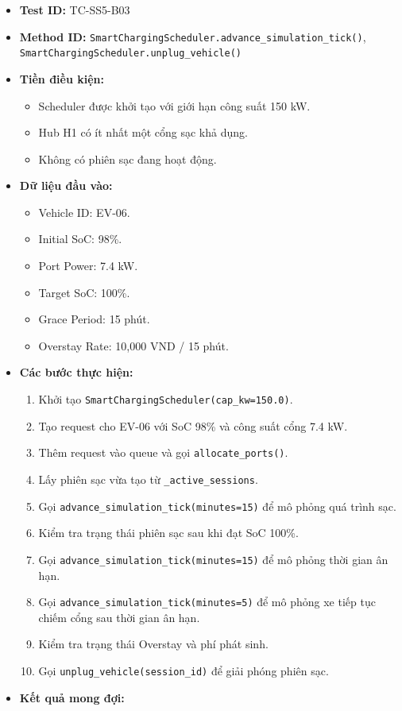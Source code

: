\documentclass[11pt,a4paper]{article}
\providecommand{\tightlist}{%
  \setlength{\itemsep}{0pt}\setlength{\parskip}{0pt}}
\begin{document}
\begin{itemize}
\tightlist
\item
  \textbf{Test ID:} TC-SS5-B03
\item
  \textbf{Method ID:}
  \texttt{SmartChargingScheduler.advance\_simulation\_tick()},
  \texttt{SmartChargingScheduler.unplug\_vehicle()}
\item
  \textbf{Tiền điều kiện:}

  \begin{itemize}
  \tightlist
  \item
    Scheduler được khởi tạo với giới hạn công suất 150 kW.
  \item
    Hub H1 có ít nhất một cổng sạc khả dụng.
  \item
    Không có phiên sạc đang hoạt động.
  \end{itemize}
\item
  \textbf{Dữ liệu đầu vào:}

  \begin{itemize}
  \tightlist
  \item
    Vehicle ID: EV-06.
  \item
    Initial SoC: 98\%.
  \item
    Port Power: 7.4 kW.
  \item
    Target SoC: 100\%.
  \item
    Grace Period: 15 phút.
  \item
    Overstay Rate: 10,000 VND / 15 phút.
  \end{itemize}
\item
  \textbf{Các bước thực hiện:}

  \begin{enumerate}
  \def\labelenumi{\arabic{enumi}.}
  \tightlist
  \item
    Khởi tạo \texttt{SmartChargingScheduler(cap\_kw=150.0)}.
  \item
    Tạo request cho EV-06 với SoC 98\% và công suất cổng 7.4 kW.
  \item
    Thêm request vào queue và gọi \texttt{allocate\_ports()}.
  \item
    Lấy phiên sạc vừa tạo từ \texttt{\_active\_sessions}.
  \item
    Gọi \texttt{advance\_simulation\_tick(minutes=15)} để mô phỏng quá
    trình sạc.
  \item
    Kiểm tra trạng thái phiên sạc sau khi đạt SoC 100\%.
  \item
    Gọi \texttt{advance\_simulation\_tick(minutes=15)} để mô phỏng thời
    gian ân hạn.
  \item
    Gọi \texttt{advance\_simulation\_tick(minutes=5)} để mô phỏng xe
    tiếp tục chiếm cổng sau thời gian ân hạn.
  \item
    Kiểm tra trạng thái Overstay và phí phát sinh.
  \item
    Gọi \texttt{unplug\_vehicle(session\_id)} để giải phóng phiên sạc.
  \end{enumerate}
\item
  \textbf{Kết quả mong đợi:}


\end{itemize}
\end{document}
